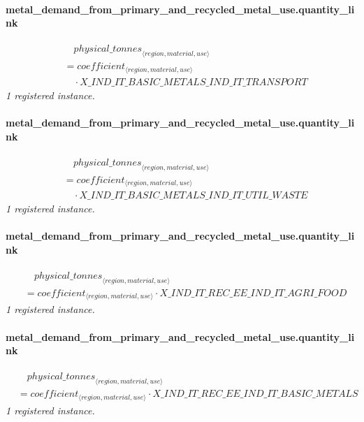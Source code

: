 \documentclass[11pt]{article}
\begin{document}
\paragraph{metal\_demand\_from\_primary\_and\_recycled\_metal\_use.quantity\_link}
\begin{align*}
&\quad {physical\_tonnes}_{\langle region, material, use\rangle}\\
&= coefficient_{\langle region, material, use\rangle}\\
&\quad {}\cdot X\_IND\_IT\_BASIC\_METALS\_IND\_IT\_TRANSPORT
\end{align*}
\noindent\emph{1 registered instance.}\par
\paragraph{metal\_demand\_from\_primary\_and\_recycled\_metal\_use.quantity\_link}
\begin{align*}
&\quad {physical\_tonnes}_{\langle region, material, use\rangle}\\
&= coefficient_{\langle region, material, use\rangle}\\
&\quad {}\cdot X\_IND\_IT\_BASIC\_METALS\_IND\_IT\_UTIL\_WASTE
\end{align*}
\noindent\emph{1 registered instance.}\par
\paragraph{metal\_demand\_from\_primary\_and\_recycled\_metal\_use.quantity\_link}
\begin{align*}
&\quad {physical\_tonnes}_{\langle region, material, use\rangle}\\
&= coefficient_{\langle region, material, use\rangle} \cdot X\_IND\_IT\_REC\_EE\_IND\_IT\_AGRI\_FOOD
\end{align*}
\noindent\emph{1 registered instance.}\par
\paragraph{metal\_demand\_from\_primary\_and\_recycled\_metal\_use.quantity\_link}
\begin{align*}
&\quad {physical\_tonnes}_{\langle region, material, use\rangle}\\
&= coefficient_{\langle region, material, use\rangle} \cdot X\_IND\_IT\_REC\_EE\_IND\_IT\_BASIC\_METALS
\end{align*}
\noindent\emph{1 registered instance.}\par
\end{document}
